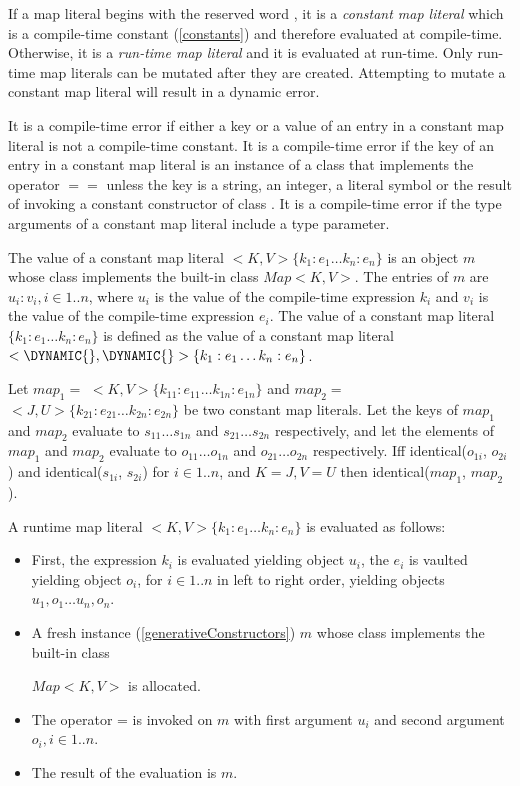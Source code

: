 \documentclass{article}
\newcommand{\code}[1]{{\sf #1}}
\begin{document}
\LMHash{}
If a map literal begins with the reserved word \CONST{}, it is a {\em constant map literal} which is a compile-time constant (\ref{constants}) and therefore evaluated at compile-time. Otherwise, it is a {\em run-time map literal} and it is evaluated at run-time. Only run-time map literals can be mutated
after they are created. Attempting to mutate a constant map literal will result in a dynamic error.

\LMHash{}
It is a compile-time error if either a key or a value of an entry in a constant map literal is not a compile-time constant. It is a compile-time error if the key of an entry in a constant map literal is an instance of a class that implements the operator $==$ unless the key is a 
string, an integer, a literal symbol or the result of invoking a constant constructor of class . 
It is a compile-time error if the type arguments of a constant map literal include a type parameter. 

\LMHash{}
The value of a constant map literal  \CONST{}$ <K, V>\{k_1:e_1\ldots k_n :e_n\}$ is an object $m$ whose class implements the built-in class $Map<K, V>$. The entries of $m$ are $u_i:v_i, i \in 1 .. n$, where $u_i$ is the value of the compile-time expression $k_i$ and $v_i$ is the value of the compile-time expression $e_i$.  The value of a constant map literal  \CONST{} $\{k_1:e_1\ldots k_n :e_n\}$ is defined as the value of a constant map literal \CONST{} $<\DYNAMIC{}, \DYNAMIC{}>\{k_1:e_1\ldots k_n :e_n\}$.

\LMHash{}
Let $map_1 =$ \CONST{}$ <K, V>\{k_{11}:e_{11} \ldots k_{1n} :e_{1n}\}$ and  $map_2 =$  \CONST{}$ <J, U>\{k_{21}:e_{21} \ldots k_{2n} :e_{2n}\}$ be two constant map literals. Let the keys of $map_1$ and $map_2$ evaluate to  $s_{11} \ldots  s_{1n}$  and   $s_{21} \ldots  s_{2n}$ respectively, and let the elements of $map_1$ and $map_2$ evaluate to $o_{11} \ldots  o_{1n}$ and $o_{21} \ldots  o_{2n}$ respectively. Iff \code{identical($o_{1i}$, $o_{2i}$)}  and \code{identical($s_{1i}$, $s_{2i}$)} for $i \in 1.. n$, and $K = J, V = U$ then \code{identical($map_1$, $map_2$)}. 


\LMHash{}
A runtime map literal $<K, V>\{k_1:e_1\ldots k_n :e_n\}$  is evaluated as follows:
\begin{itemize}
\item
First, the expression $k_i$ is evaluated yielding object $u_i$, the $e_i$ is vaulted yielding object $o_i$, for $i \in 1..n$ in left to right order, yielding objects $u_1, o_1\ldots u_n, o_n$.
\item  A fresh instance (\ref{generativeConstructors}) $m$ whose class implements the built-in class
 
 $Map<K, V>$ is allocated. 
\item
The operator \code{[]=} is invoked on $m$ with  first  argument $u_i$ and second argument $o_i,  i \in 1.. n$.
\item
The result of the evaluation is $m$.
\end{itemize}
\end{document}
